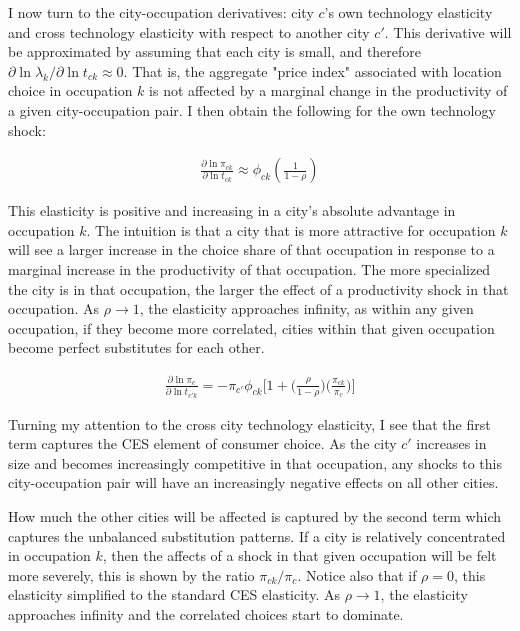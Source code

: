\documentclass[10pt]{article}
\begin{document}
I now turn to the city-occupation derivatives: city $c$'s own technology elasticity and cross technology elasticity with respect to another city $c'$. This derivative will be approximated by assuming that each city is small, and therefore $\partial \ln \lambda_k / \partial \ln t_{ck} \approx 0$. That is, the aggregate "price index" associated with location choice in occupation $k$ is not affected by a marginal change in the productivity of a given city-occupation pair. I then obtain the following for the own technology shock:

\begin{align}
    \frac{\partial \ln \pi_{ck}}{\partial \ln t_{ck}} \approx \phi_{ck} \left( \frac{1}{1 - \rho} \right)
    \label{co_own_elasticity}
\end{align}

This elasticity is positive and increasing in a city's absolute advantage in occupation $k$. The intuition is that a city that is more attractive for occupation $k$ will see a larger increase in the choice share of that occupation in response to a marginal increase in the productivity of that occupation. The more specialized the city is in that occupation, the larger the effect of a productivity shock in that occupation. As $\rho \rightarrow 1$, the elasticity approaches infinity, as within any given occupation, if they become more correlated, cities within that given occupation become perfect substitutes for each other.

\begin{align}
    \frac{\partial\ln{\pi_{c}}}{\partial\ln{t_{{c'}k}}} = -{\pi_{c'}}{\phi_{ck}}\Big[1+\Big(\frac{\rho}{1-\rho}\Big)\Big(\frac{\pi_{ck}}{\pi_{c}}\Big)\Big]
    \label{co_cross_elasticity}
\end{align}

Turning my attention to the cross city technology elasticity, I see that the first term captures the CES element of consumer choice. As the city $c'$ increases in size and becomes increasingly competitive in that occupation, any shocks to this city-occupation pair will have an increasingly negative effects on all other cities.

How much the other cities will be affected is captured by the second term which captures the unbalanced substitution patterns. If a city is relatively concentrated in occupation $k$, then the affects of a shock in that given occupation will be felt more severely, this is shown by the ratio $\pi_{ck} / \pi_c$. Notice also that if $\rho = 0$, this elasticity simplified to the standard CES elasticity. As $\rho \rightarrow 1$, the elasticity approaches infinity and the correlated choices start to dominate.
\end{document}
